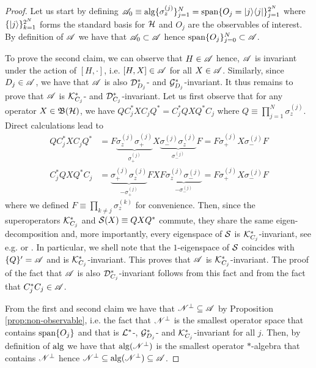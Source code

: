 \documentclass[aihp,12pt]{imsart}
\begin{document}
\begin{proof}
Let us start by defining $\mathscr{A}_0\equiv{\rm alg}\{\sigma_z^{(j)}\}_{j=1}^N = {\rm span}\{O_j = \left\vert j \middle>\middle< j \right\vert\}_{j=1}^{2^{N}}$ where $\{\left| j \right>\}_{k=1}^{2^N}$ forms the standard basis for $\mathcal{H}$ and $O_j$ are the observables of interest. By definition of $\mathscr{A}$ we have that $\mathscr{A}_0\subset\mathscr{A}$ hence ${\rm span}\{O_j\}_{j=0}^N\subset \mathscr{A}$.



To prove the second claim, we can observe that $H\in\mathscr{A}$ hence, $\mathscr{A}$ is invariant under the action of $[H,\cdot]$, i.e. $[H,X]\in\mathscr{A}$ for all $X\in\mathscr{A}$. Similarly, since $D_j\in\mathscr{A}$, we have that $\mathscr{A}$ is also $\mathcal{D}_{D_j}^*$- and $\mathcal{G}_{D_j}^*$-invariant. 
It thus remains to prove that $\mathscr{A}$ is $\mathcal{K}_{C_j}^*$- and $\mathcal{D}_{C_j}^*$-invariant. Let us first observe that for any operator $X\in\mathfrak{B}(\mathcal{H})$, we have $Q C_j^* X C_j Q^* = C_j^* Q X Q^* C_j$ where $Q\equiv \prod_{j=1}^N \sigma_z^{(j)}$. Direct calculations lead to 
\begin{align*}
    Q C_j^* X C_j Q^* &= F \underbrace{\sigma_z^{(j)} \sigma_+^{(j)}}_{\sigma_+^{(j)}} X \underbrace{\sigma_-^{(j)} \sigma_z^{(j)}}_{\sigma_-^{(j)}} F = F  \sigma_+^{(j)} X \sigma_-^{(j)} F\\
    C_j^* Q X Q^* C_j &= \underbrace{\sigma_+^{(j)} \sigma_z^{(j)}}_{-\sigma_+^{(j)}} F X F \underbrace{\sigma_z^{(j)} \sigma_-^{(j)}}_{-\sigma_-^{(j)}} = F \sigma_+^{(j)} X \sigma_-^{(j)} F
\end{align*}
where we defined $F\equiv \prod_{k\neq j} \sigma_z^{(k)}$ for convenience. Then, since the superoperators $\mathcal{K}_{C_j}^*$ and $\mathcal{S}(X)\equiv Q X Q^*$ commute, they share the same eigen-decomposition and, more importantly, every eigenspace of $\mathcal{S}$ is $\mathcal{K}_{C_j}^*$-invariant, see e.g. \cite[Sec. V.B]{prxq2024} or \cite{Buča_2012}. In particular, we shell note that the $1$-eigenspace of $\mathcal{S}$ coincides with $\{Q\}' = \mathscr{A}$ and is $\mathcal{K}_{C_j}^*$-invariant. This proves that $\mathscr{A}$ is $\mathcal{K}_{C_j}^*$-invariant. The proof of the fact that $\mathscr{A}$ is also $\mathcal{D}_{C_j}^*$-invariant follows from this fact and from the fact that $C_j^* C_j\in\mathscr{A}$.    

From the first and second claim we have that $\mathscr{N}^\perp\subseteq\mathscr{A}$ by  Proposition \ref{prop:non-observable}, i.e. the fact that $\mathscr{N}^\perp$ is the smallest operator space that contains ${\rm span}\{O_j\}$ and that is $\mathcal{L}^*$-, $\mathcal{G}_{D_j}^*$- and $\mathcal{K}_{C_j}^*$-invariant for all $j$. Then, by definition of ${\rm alg}$ we have that ${\rm alg}(\mathscr{N}^\perp)$ is the smallest operator $*$-algebra that contains $\mathscr{N}^\perp$ hence $\mathscr{N}^\perp\subseteq{\rm alg}(\mathscr{N}^\perp)\subseteq\mathscr{A}$. 
\end{proof}
\end{document}
